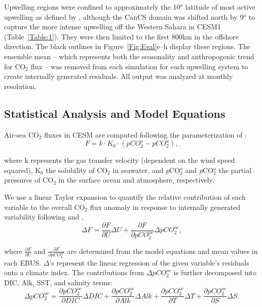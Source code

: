 \documentclass[hvmath, online,bgd]{copernicus_discussions}
\begin{document}
Upwelling regions were confined to approximately the 10$^{o}$ latitude of most active upwelling as defined by \citet{Chavez:2009}, although the CanCS domain was shifted north by 9$^{o}$ to capture the more intense upwelling off the Western Sahara in CESM1 (Table~\ref{Table:1}). They were then limited to the first 800km in the offshore direction. The black outlines in Figure~\ref{Fig:Eval}e--h display these regions. The ensemble mean -- which represents both the seasonality and anthropogenic trend for CO$_{2}$ flux -- was removed from each simulation for each upwelling system to create internally generated residuals. All output was analyzed at monthly resolution.

\subsection{Statistical Analysis and Model Equations}
Air-sea CO$_{2}$ fluxes in CESM are computed following the parameterization of \citet{Wanninkhof:2014}:
\begin{equation}
	F = k\cdot K_{0}\cdot\left( pCO_{2}^{o} - pCO_{2}^{a}\right) ,
\end{equation}

\noindent where k represents the gas transfer velocity (dependent on the wind speed squared), K$_{0}$ the solubility of CO$_{2}$ in seawater, and \textit{p}CO$_{2}^{o}$ and \textit{p}CO$_{2}^{a}$ the partial pressures of CO$_{2}$ in the surface ocean and atmosphere, respectively. 

We use a linear Taylor expansion to quantify the relative contribution of each variable to the overall CO$_{2}$ flux anomaly in response  to internally generated variability following \citet{Lovenduski:2007} and \citet{Turi:2014}, 
\begin{equation}
	\Delta F = \frac{\partial F}{\partial U}\Delta U + \frac{\partial F}{\partial pCO_{2}^{oc}}\Delta pCO_{2}^{oc} ,
\end{equation}

\noindent where $\frac{\partial F}{\partial U}$ and $\frac{\partial F}{\partial pCO_{2}^{oc}}$ are determined from the model equations and mean values in each EBUS. $\Delta$'s represent the linear regression of the given variable's residuals onto a climate index. The contributions from $\Delta pCO_{2}^{oc}$ is further decomposed into DIC, Alk, SST, and salinity terms:
\begin{equation}
	\Delta pCO_{2}^{oc} = \frac{\partial pCO_{2}^{oc}}{\partial DIC}\Delta DIC + \frac{\partial pCO_{2}^{oc}}{\partial Alk}\Delta Alk + \frac{\partial pCO_{2}^{oc}}{\partial T}\Delta T + \frac{\partial pCO_{2}^{oc}}{\partial S}\Delta S .
\end{equation}
\end{document}
